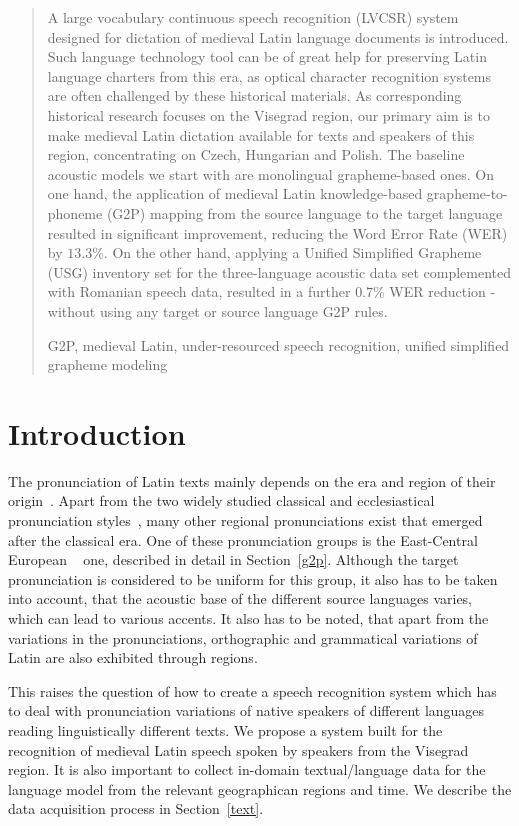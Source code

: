 \documentclass[runningheads,a4paper]{llncs}
\newcommand{\keywords}[1]{\par\addvspace\baselineskip
\noindent\keywordname\enspace\ignorespaces#1}
\begin{document}
%
%
%
%
\begin{abstract}
A large vocabulary continuous speech recognition (LVCSR) system designed for dictation of medieval Latin language documents is introduced.
Such language technology tool can be of great help for preserving Latin language charters from this era, as optical character recognition systems are often challenged by these historical materials.
As corresponding historical research focuses on the Visegrad region, our primary aim is to make medieval Latin dictation available for texts and speakers of this region, concentrating on Czech, Hungarian and Polish.
The baseline acoustic models we start with are monolingual grapheme-based ones. 
On one hand, the application of medieval Latin knowledge-based grapheme-to-phoneme (G2P) mapping from the source language to the target language resulted in significant improvement, reducing the Word Error Rate (WER) by $13.3\%$. 
On the other hand, applying a Unified Simplified Grapheme (USG) inventory set for the three-language acoustic data set complemented with Romanian speech data, resulted in a further $0.7\%$ WER reduction - without using any target or source language G2P rules.
\keywords{G2P, medieval Latin, under-resourced speech recognition, unified simplified grapheme modeling}
\end{abstract}

\section{Introduction}
The pronunciation of Latin texts mainly depends on the era and region of their origin~\cite{regional}.
Apart from the two widely studied classical and ecclesiastical pronunciation styles~\cite{allen78}, many other regional pronunciations exist that emerged after the classical era.
One of these pronunciation groups is the East-Central European ~\cite{regional} one, described in detail in Section~\ref{g2p}.
Although the target pronunciation is considered to be uniform for this group, it also has to be taken into account, that the acoustic base of the different source languages varies, which can lead to various accents.
It also has to be noted, that apart from the variations in the pronunciations, orthographic and grammatical variations of Latin are also exhibited through regions.

This raises the question of how to create a speech recognition system which has to deal with pronunciation variations of native speakers of different languages reading linguistically different texts.
We propose a system built for the recognition of medieval Latin speech spoken by speakers from the Visegrad region.
It is also important to collect in-domain textual/language data for the language model from the relevant geographican regions and time.
We describe the data acquisition process in Section~\ref{text}.
\end{document}
